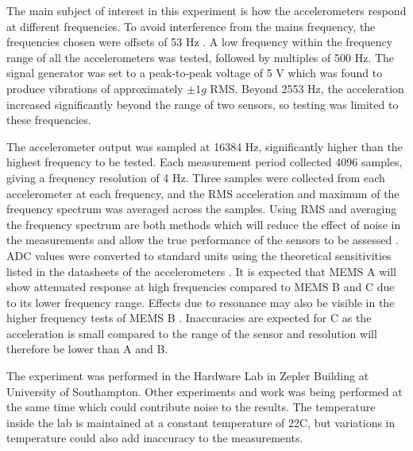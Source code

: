 The main subject of interest in this experiment is how the accelerometers respond at different frequencies.
To avoid interference from the mains frequency, the frequencies chosen were offsets of 53 Hz \cite{MEMS_testing}.
A low frequency within the frequency range of all the accelerometers was tested, followed by multiples of 500 Hz.
The signal generator was set to a peak-to-peak voltage of 5 V which was found to produce vibrations of approximately $\pm 1 g$ RMS.
Beyond 2553 Hz, the acceleration increased significantly beyond the range of two sensors, so testing was limited to these frequencies.
\par

The accelerometer output was sampled at 16384 Hz, significantly higher than the highest frequency to be tested.
Each measurement period collected 4096 samples, giving a frequency resolution of 4 Hz.
Three samples were collected from each accelerometer at each frequency, and the RMS acceleration and maximum of the frequency spectrum was averaged across the samples.
Using RMS and averaging the frequency spectrum are both methods which will reduce the effect of noise in the measurements and allow the true performance of the sensors to be assessed \cite{CM_randall}.
ADC values were converted to standard units using the theoretical sensitivities listed in the datasheets of the accelerometers \cite{MMA7361}\cite{ADXL354}\cite{ADXL1002}.
It is expected that MEMS A will show attenuated response at high frequencies compared to MEMS B and C due to its lower frequency range.
Effects due to resonance may also be visible in the higher frequency tests of MEMS B \cite{ADXL354}.
Inaccuracies are expected for C as the acceleration is small compared to the range of the sensor and resolution will therefore be lower than A and B.
\par

The experiment was performed in the Hardware Lab in Zepler Building at University of Southampton.
Other experiments and work was being performed at the same time which could contribute noise to the results.
The temperature inside the lab is maintained at a constant temperature of 22\textdegree{}C, but variations in temperature could also add inaccuracy to the measurements.

